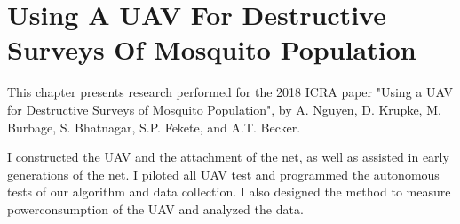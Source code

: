 \chapter[UAV Surveying Mosquitoes]{Using A UAV For Destructive Surveys Of Mosquito Population}

This chapter presents research performed for the 2018 ICRA paper "Using a UAV for Destructive Surveys of Mosquito Population", by A. Nguyen, D. Krupke, M. Burbage, S. Bhatnagar, S.P. Fekete, and A.T. Becker. \cite{icra2018}

I constructed the UAV and the attachment of the net, as well as assisted in early generations of the net. I piloted all UAV test and programmed the autonomous tests of our algorithm and data collection. I also designed the method to measure powerconsumption of the UAV and analyzed the data.







